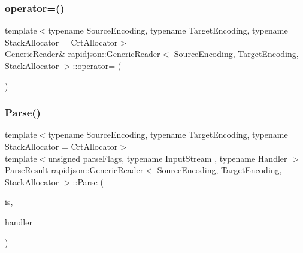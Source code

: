 \subsubsection{\texorpdfstring{operator=()}{operator=()}}
{\footnotesize\ttfamily template$<$typename Source\+Encoding, typename Target\+Encoding, typename Stack\+Allocator = Crt\+Allocator$>$ \\
\mbox{\hyperlink{classrapidjson_1_1_generic_reader}{Generic\+Reader}}\& \mbox{\hyperlink{classrapidjson_1_1_generic_reader}{rapidjson\+::\+Generic\+Reader}}$<$ Source\+Encoding, Target\+Encoding, Stack\+Allocator $>$\+::operator= (\begin{DoxyParamCaption}\item[{const \mbox{\hyperlink{classrapidjson_1_1_generic_reader}{Generic\+Reader}}$<$ Source\+Encoding, Target\+Encoding, Stack\+Allocator $>$ \&}]{ }\end{DoxyParamCaption})\hspace{0.3cm}{\ttfamily [private]}}

\mbox{\label{classrapidjson_1_1_generic_reader_ac9c540b77de19661f6f45e04b9b0937b}} 
\subsubsection{\texorpdfstring{Parse()}{Parse()}\hspace{0.1cm}{\footnotesize\ttfamily [1/2]}}
{\footnotesize\ttfamily template$<$typename Source\+Encoding, typename Target\+Encoding, typename Stack\+Allocator = Crt\+Allocator$>$ \\
template$<$unsigned parse\+Flags, typename Input\+Stream , typename Handler $>$ \\
\mbox{\hyperlink{structrapidjson_1_1_parse_result}{Parse\+Result}} \mbox{\hyperlink{classrapidjson_1_1_generic_reader}{rapidjson\+::\+Generic\+Reader}}$<$ Source\+Encoding, Target\+Encoding, Stack\+Allocator $>$\+::Parse (\begin{DoxyParamCaption}\item[{Input\+Stream \&}]{is,  }\item[{\mbox{\hyperlink{classrapidjson_1_1_handler}{Handler}} \&}]{handler }\end{DoxyParamCaption})}




